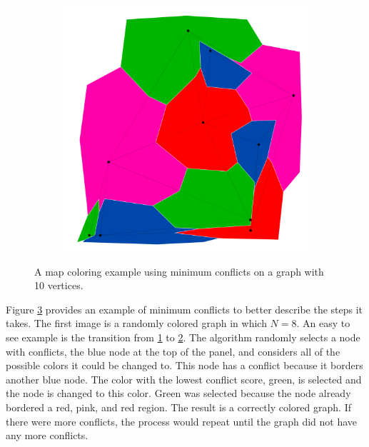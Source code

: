 \documentclass{article}
\begin{document}
\begin{figure}[h!]
\begin{subfigure}{0.18\textwidth}
				\caption{}
				\label{mind}
			\end{subfigure}
			\;
			\begin{subfigure}{0.18\textwidth}
				\centering
				\includegraphics[width=\textwidth]{images/sequences/min/minconf_I00007}
				\caption{}
				\label{mine}
			\end{subfigure} 

			\caption{A map coloring example using minimum conflicts on a graph with 10 vertices.}
			\label{min_ex}
		\end{figure}


		Figure \ref{min_ex} provides an example of minimum conflicts to better describe the steps it takes.  The first image is a randomly colored graph in which $N = 8$. An easy to see example is the transition from \ref{mind} to \ref{mine}.  The algorithm randomly selects a node with conflicts, the blue node at the top of the panel, and considers all of the possible colors it could be changed to. This node has a conflict because it borders another blue node.   The color with the lowest conflict score, green, is selected and the node is changed to this color. Green was selected because the node already bordered a red, pink, and red region. The result is a correctly colored graph. If there were more conflicts, the process would repeat until the graph did not have any more conflicts.  
		
\end{document}
